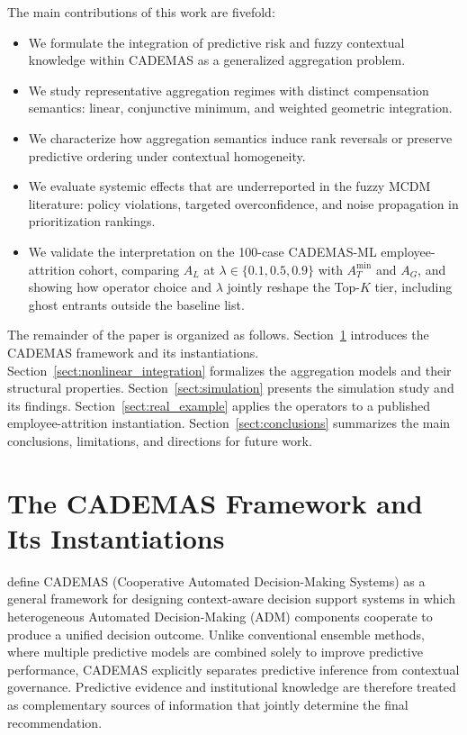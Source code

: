 \documentclass[mathematics,article,submit,moreauthors]{Definitions/mdpi}
\begin{document}
The main contributions of this work are fivefold:

\begin{itemize}
\item We formulate the integration of predictive risk and fuzzy contextual knowledge within CADEMAS as a generalized aggregation problem.

\item We study representative aggregation regimes with distinct compensation semantics: linear, conjunctive minimum, and weighted geometric integration.

\item We characterize how aggregation semantics induce rank reversals or preserve predictive ordering under contextual homogeneity.

\item We evaluate systemic effects that are underreported in the fuzzy MCDM literature: policy violations, targeted overconfidence, and noise propagation in prioritization rankings.

\item We validate the interpretation on the 100-case CADEMAS-ML employee-attrition cohort, comparing $A_L$ at $\lambda \in \{0.1, 0.5, 0.9\}$ with $A_T^{\min}$ and $A_G$, and showing how operator choice and $\lambda$ jointly reshape the Top-$K$ tier, including ghost entrants outside the baseline list.
\end{itemize}

The remainder of the paper is organized as follows. Section~\ref{sect:cademas} introduces the CADEMAS framework and its instantiations. Section~\ref{sect:nonlinear_integration} formalizes the aggregation models and their structural properties. Section~\ref{sect:simulation} presents the simulation study and its findings. Section~\ref{sect:real_example} applies the operators to a published employee-attrition instantiation. Section~\ref{sect:conclusions} summarizes the main conclusions, limitations, and directions for future work.



\section{The CADEMAS Framework and Its Instantiations}\label{sect:cademas}

\citet{NovoaHernandez2026} define CADEMAS (Cooperative Automated Decision-Making Systems) as a general framework for designing context-aware decision support systems in which heterogeneous Automated Decision-Making (ADM) components cooperate to produce a unified decision outcome. Unlike conventional ensemble methods, where multiple predictive models are combined solely to improve predictive performance, CADEMAS explicitly separates predictive inference from contextual governance. Predictive evidence and institutional knowledge are therefore treated as complementary sources of information that jointly determine the final recommendation.
\end{document}
